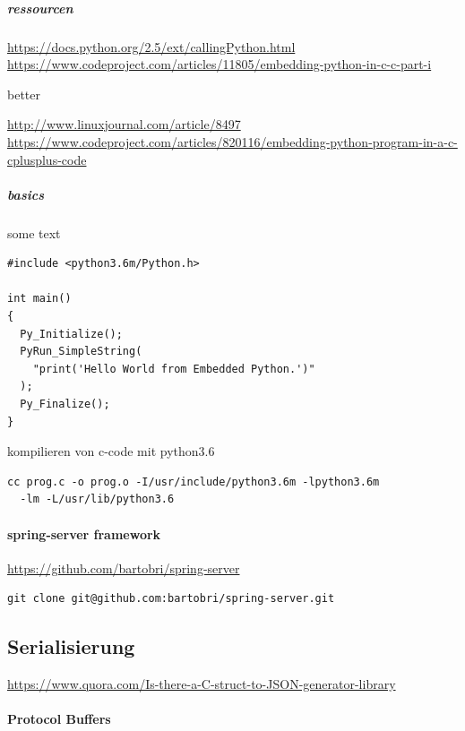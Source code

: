 \documentclass[a4paper,10pt]{article}
\begin{document}
\subparagraph{ressourcen}

\url{https://docs.python.org/2.5/ext/callingPython.html}
\url{https://www.codeproject.com/articles/11805/embedding-python-in-c-c-part-i}

better

\url{http://www.linuxjournal.com/article/8497}
\url{https://www.codeproject.com/articles/820116/embedding-python-program-in-a-c-cplusplus-code}

\subparagraph{basics}

some text

\begin{lstlisting}[frame=single,caption=Python in C ausführen]
#include <python3.6m/Python.h>

int main()
{
  Py_Initialize();
  PyRun_SimpleString(
    "print('Hello World from Embedded Python.')"
  );
  Py_Finalize();
}
\end{lstlisting}

kompilieren von c-code mit python3.6

\begin{lstlisting}[frame=single,caption=Python in C kompilieren]
cc prog.c -o prog.o -I/usr/include/python3.6m -lpython3.6m 
  -lm -L/usr/lib/python3.6
\end{lstlisting}

\paragraph{spring-server framework}

\url{https://github.com/bartobri/spring-server}

\begin{lstlisting}[frame=single,caption=Installation bartobri/spring-server]
git clone git@github.com:bartobri/spring-server.git
\end{lstlisting}

\subsection{Serialisierung}

\url{https://www.quora.com/Is-there-a-C-struct-to-JSON-generator-library}

\paragraph{Protocol Buffers}

\end{document}
